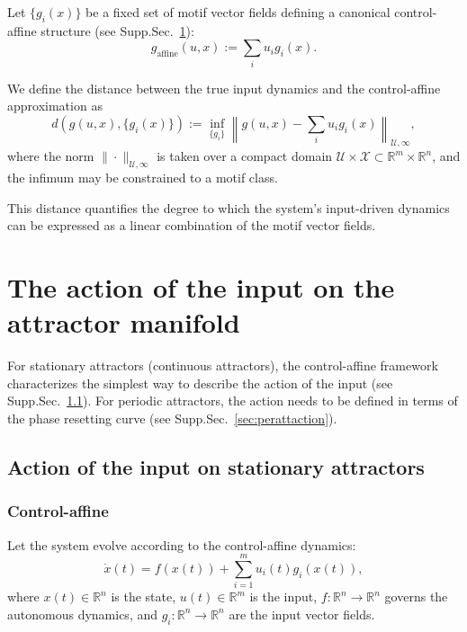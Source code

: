 \documentclass{article}
\theoremstyle{definition} \newtheorem{definition}{Definition}  \newtheorem{example}{Example}
\theoremstyle{remark} \newtheorem{remark}{Remark}
\newcounter{ct}
\begin{document}
Let \( \{ g_i(x) \} \) be a fixed set of motif vector fields defining a canonical control-affine structure (see Supp.Sec.~\ref{sec:attaction}):
\[
g_{\text{affine}}(u, x) := \sum_i u_i g_i(x).
\]

We define the distance between the true input dynamics and the control-affine approximation as
\[
d(g(u, x), \{ g_i(x) \}) := \inf_{\{ g_i \}} \left\| g(u, x) - \sum_i u_i g_i(x) \right\|_{\mathcal{U}, \infty},
\]
where the norm \( \| \cdot \|_{\mathcal{U}, \infty} \) is taken over a compact domain \( \mathcal{U} \times \mathcal{X} \subset \mathbb{R}^m \times \mathbb{R}^n \), and the infimum may be constrained to a motif class.

This distance quantifies the degree to which the system's input-driven dynamics can be expressed as a linear combination of the motif vector fields.

\section{The action of the input on the attractor manifold}\label{sec:attaction}
For stationary attractors (continuous attractors), the control-affine framework characterizes the simplest way to describe the action of the input (see Supp.Sec.~\ref{sec:statattaction}).
For periodic attractors, the action needs to be defined in terms of the phase resetting curve (see Supp.Sec.~\ref{sec:perattaction}).


\subsection{Action of the input on  stationary attractors}\label{sec:statattaction}
\subsubsection{Control-affine}\label{sec:controlaffine}
Let the system evolve according to the control-affine dynamics:
\[
\dot{x}(t) = f(x(t)) + \sum_{i=1}^m u_i(t) g_i(x(t)),
\]
where \( x(t) \in \mathbb{R}^n \) is the state, \( u(t) \in \mathbb{R}^m \) is the input, \( f : \mathbb{R}^n \to \mathbb{R}^n \) governs the autonomous dynamics, and \( g_i : \mathbb{R}^n \to \mathbb{R}^n \) are the input vector fields.
\end{document}
